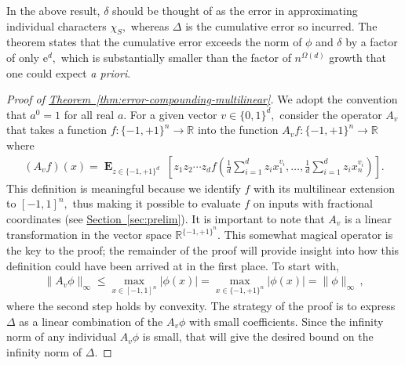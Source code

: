 \documentclass[10pt]{article}
\theoremstyle{definition}
\numberwithin{equation}{section}
\newcommand{\R}{{\mathbb R}}
\newcommand{\expref}[2]{\texorpdfstring{\hyperref[#2]{#1~\ref{#2}}}{#1~\ref{#2}}}
\newcommand{\moo}{\{-1,+1\}}
\newcommand{\moon}{\moo^n}
\newcommand{\zoo}{\{0,1\}}
\DeclareMathOperator*{\Exp}{\mathbf{E}}
\newcommand{\e}{\mathrm{e}}  %
\begin{document}
In the above result, $\delta$ should be thought of as
the error in approximating individual characters
$\chi_S,$ whereas $\Delta$ is the cumulative error
so incurred.  The theorem states that the cumulative error
exceeds the norm of $\phi$ and $\delta$ by a factor of
only $\e^d,$ which is substantially smaller than the
factor of $n^{\Omega(d)}$ growth that one could expect
\emph{a priori}.

\begin{proof}[Proof of \expref{Theorem}{thm:error-compounding-multilinear}]
We adopt
the convention that $a^0=1$ for all real $a$. For a
given vector $v\in\zoo^d,$ consider the 
operator $A_v$ that takes 
a function $f\colon\moon\to\R$ into
%
%
%
the
%
function $A_vf\colon\moon\to\R$ where
\begin{align*}
(A_vf)(x) = 
\Exp_{z\in\moo^d} \;\left[ z_1z_2\cdots z_df\left(\frac1d\sum_{i=1}^d
z_ix_1^{v_i}, \dots,
                     \frac1d\sum_{i=1}^d
					 z_ix_n^{v_i}\right)\right].
\end{align*}
This definition is meaningful because we identify $f$
with its multilinear extension to $[-1,1]^n,$ thus making
it possible to evaluate $f$ on inputs with fractional
coordinates (see \expref{Section}{sec:prelim}). 
It is important to note that $A_v$ is a linear
transformation in the vector space $\R^{\moon}$.
This somewhat magical operator is the key to the
proof; the remainder of the proof will provide insight
into how this definition could have been arrived at in the
first place. To start with, 
\begin{align}
\|A_v\phi\|_\infty \leq
\max_{x\in[-1,1]^n}|\phi(x)| = 
\max_{x\in\moon}|\phi(x)| = \|\phi\|_\infty\,,
\label{eqn:A_v-small}
\end{align}
where the second step holds by convexity.  The strategy
of the proof is to express $\Delta$ as a linear
combination of the $A_v\phi$ with small coefficients.
Since the infinity norm of any individual $A_v\phi$
is small, that will give the desired bound on the
infinity norm of $\Delta$. 


\end{proof}
\end{document}
